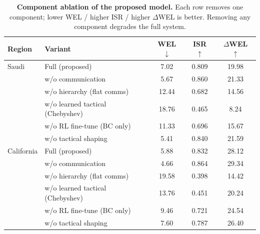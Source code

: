 \begin{table}[t]
\centering
\caption{\textbf{Component ablation of the proposed model.} Each row removes one component; lower WEL / higher ISR / higher $\Delta$WEL is better. Removing any component degrades the full system.}
\label{tab:ablation}
\begin{tabular}{llccc}
\toprule
Region & Variant & WEL $\downarrow$ & ISR $\uparrow$ & $\Delta$WEL $\uparrow$ \\
\midrule
Saudi & Full (proposed) & 7.02 & 0.809 & 19.98 \\
 & w/o communication & 5.67 & 0.860 & 21.33 \\
 & w/o hierarchy (flat comms) & 12.44 & 0.682 & 14.56 \\
 & w/o learned tactical (Chebyshev) & 18.76 & 0.465 & 8.24 \\
 & w/o RL fine-tune (BC only) & 11.33 & 0.696 & 15.67 \\
 & w/o tactical shaping & 5.41 & 0.840 & 21.59 \\
\midrule
California & Full (proposed) & 5.88 & 0.832 & 28.12 \\
 & w/o communication & 4.66 & 0.864 & 29.34 \\
 & w/o hierarchy (flat comms) & 19.58 & 0.398 & 14.42 \\
 & w/o learned tactical (Chebyshev) & 13.76 & 0.451 & 20.24 \\
 & w/o RL fine-tune (BC only) & 9.46 & 0.721 & 24.54 \\
 & w/o tactical shaping & 7.60 & 0.787 & 26.40 \\
\bottomrule
\end{tabular}
\end{table}

